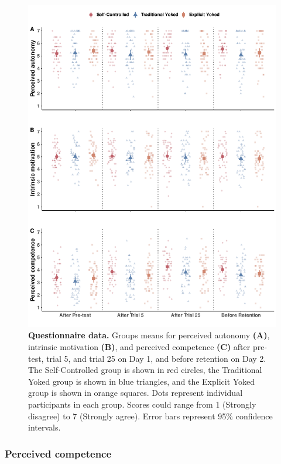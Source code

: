 \documentclass[
  english,
  doc, donotrepeattitle,floatsintext]{apa7}
\begin{document}
\begin{figure}

{\centering \includegraphics[height=0.72\textheight]{../../figs/fig2} 

}

\caption{\textbf{Questionnaire data.} Groups means for perceived autonomy \textbf{(A)}, intrinsic motivation \textbf{(B)}, and perceived competence \textbf{(C)} after pre-test, trial 5, and trial 25 on Day 1, and before retention on Day 2. The Self-Controlled group is shown in red circles, the Traditional Yoked group is shown in blue triangles, and the Explicit Yoked group is shown in orange squares. Dots represent individual participants in each group. Scores could range from 1 (Strongly disagree) to 7 (Strongly agree). Error bars represent 95\% confidence intervals.}\label{fig:fig2}
\end{figure}

\hypertarget{perceived-competence}{%
\subsubsection{Perceived competence}\label{perceived-competence}}
\end{document}
